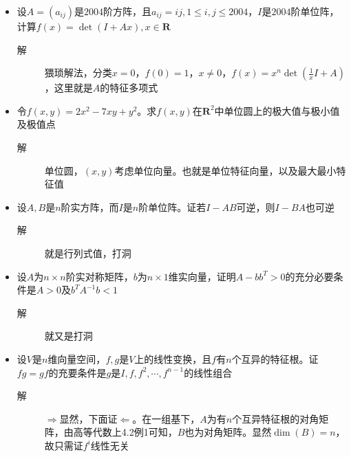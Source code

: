 \begin{itemize}
\item 设$A=(a_{ij})$是$2004$阶方阵，且$a_{ij}=ij,1\leq i,j\leq 2004$，$I$是$2004$阶单位阵，计算$f(x)=\det(I+Ax),x\in \mathbf{R}$
\begin{description}
\item[解] 猥琐解法，分类$x=0$，$f(0)=1$，$x\neq 0$，$f(x)=x^n\det(\frac{1}{x}I+A)$，这里就是$A$的特征多项式
\end{description}

\item 令$f(x,y)=2x^2-7xy+y^2$。求$f(x,y)$在$\mathbf{R}^2$中单位圆上的极大值与极小值及极值点
\begin{description}
\item[解] 单位圆，$(x,y)$考虑单位向量。也就是单位特征向量，以及最大最小特征值
\end{description}

\item 设$A,B$是$n$阶实方阵，而$I$是$n$阶单位阵。证若$I-AB$可逆，则$I-BA$也可逆
\begin{description}
\item[解] 就是行列式值，打洞
\end{description}

\item 设$A$为$n \times n$阶实对称矩阵，$b$为$n\times 1$维实向量，证明$A-bb^T>0$的充分必要条件是$A>0$及$b^TA^{-1}b<1$
\begin{description}
\item[解] 就又是打洞
\end{description}

\item 设$V$是$n$维向量空间，$f,g$是$V$上的线性变换，且$f$有$n$个互异的特征根。证$fg=gf$的充要条件是$g$是$I,f,f^2,\cdots,f^{n-1}$的线性组合
\begin{description}
\item[解] $\Rightarrow$显然，下面证$\Leftarrow$。在一组基下，$A$为有$n$个互异特征根的对角矩阵，由高等代数上4.2例1可知，$B$也为对角矩阵。显然$\dim(B)=n$，故只需证$f^i$线性无关
\end{description}



















\end{itemize}